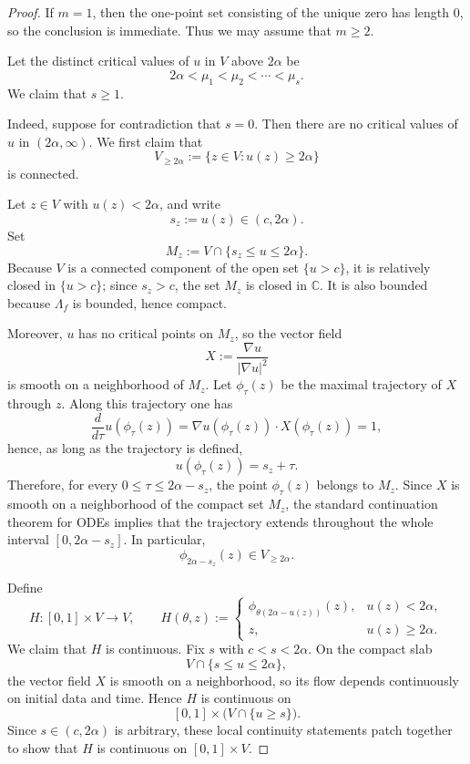 \documentclass[12pt]{amsart}
\theoremstyle{definition}
\theoremstyle{remark}
\begin{document}
\begin{proof}

If $m=1$, then the one-point set consisting of the unique zero has length $0$, so the conclusion is immediate. Thus we may assume that $m \ge 2$.

Let the distinct critical values of $u$ in $V$ above $2\alpha$ be
\[
2\alpha < \mu_1 < \mu_2 < \cdots < \mu_s.
\]
We claim that $s \ge 1$.

Indeed, suppose for contradiction that $s=0$. Then there are no critical values of $u$ in $(2\alpha,\infty)$. We first claim that
\[
V_{\ge 2\alpha}:=\{z\in V : u(z)\ge 2\alpha\}
\]
is connected.

Let $z\in V$ with $u(z)<2\alpha$, and write
\[
s_z:=u(z)\in(c,2\alpha).
\]
Set
\[
M_z:=V\cap\{s_z\le u\le 2\alpha\}.
\]
Because $V$ is a connected component of the open set $\{u>c\}$, it is relatively closed
in $\{u>c\}$; since $s_z>c$, the set $M_z$ is closed in $\mathbb C$. It is also bounded
because $\Lambda_f$ is bounded, hence compact.

Moreover, $u$ has no critical points on $M_z$, so the vector field
\[
X:=\frac{\nabla u}{|\nabla u|^2}
\]
is smooth on a neighborhood of $M_z$. Let $\phi_\tau(z)$ be the maximal trajectory of
$X$ through $z$. Along this trajectory one has
\[
\frac{d}{d\tau}u(\phi_\tau(z))
= \nabla u(\phi_\tau(z)) \cdot X(\phi_\tau(z))
= 1,
\]
hence, as long as the trajectory is defined,
\[
u(\phi_\tau(z)) = s_z + \tau.
\]
Therefore, for every $0 \le \tau \le 2\alpha - s_z$, the point $\phi_\tau(z)$ belongs to
$M_z$. Since $X$ is smooth on a neighborhood of the compact set $M_z$, the standard
continuation theorem for ODEs implies that the trajectory extends throughout the whole
interval $[0,2\alpha-s_z]$. In particular,
\[
\phi_{2\alpha-s_z}(z) \in V_{\ge 2\alpha}.
\]

Define
\[
H : [0,1]\times V \to V,
\qquad
H(\theta,z) :=
\begin{cases}
\phi_{\theta(2\alpha-u(z))}(z), & u(z)<2\alpha,\\[1mm]
z, & u(z)\ge 2\alpha.
\end{cases}
\]
We claim that $H$ is continuous. Fix $s$ with $c<s<2\alpha$. On the compact slab
\[
V \cap \{s \le u \le 2\alpha\},
\]
the vector field $X$ is smooth on a neighborhood, so its flow depends continuously on
initial data and time. Hence $H$ is continuous on
\[
[0,1]\times \bigl(V\cap\{u\ge s\}\bigr).
\]
Since $s\in(c,2\alpha)$ is arbitrary, these local continuity statements patch together to
show that $H$ is continuous on $[0,1]\times V$.


\end{proof}
\end{document}
